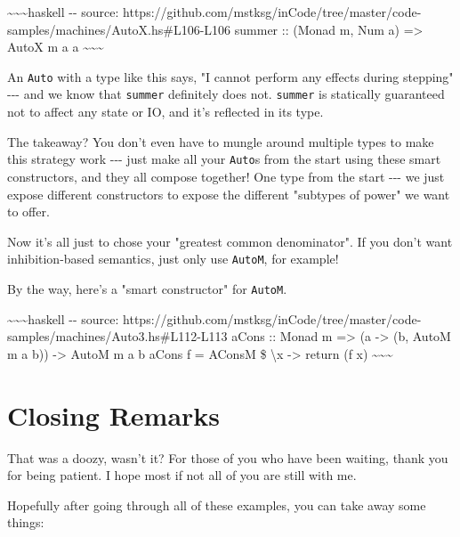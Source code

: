 \documentclass[]{article}
\begin{document}
\textasciitilde{}\textasciitilde{}\textasciitilde{}haskell -\/- source:
https://github.com/mstksg/inCode/tree/master/code-samples/machines/AutoX.hs\#L106-L106
summer :: (Monad m, Num a) =\textgreater{} AutoX m a a
\textasciitilde{}\textasciitilde{}\textasciitilde{}

An \texttt{Auto} with a type like this says, "I cannot perform any effects
during stepping" -\/-\/- and we know that \texttt{summer} definitely does not.
\texttt{summer} is statically guaranteed not to affect any state or IO, and it's
reflected in its type.

The takeaway? You don't even have to mungle around multiple types to make this
strategy work -\/-\/- just make all your \texttt{Auto}s from the start using
these smart constructors, and they all compose together! One type from the start
-\/-\/- we just expose different constructors to expose the different "subtypes
of power" we want to offer.

Now it's all just to chose your "greatest common denominator". If you don't want
inhibition-based semantics, just only use \texttt{AutoM}, for example!

By the way, here's a "smart constructor" for \texttt{AutoM}.

\textasciitilde{}\textasciitilde{}\textasciitilde{}haskell -\/- source:
https://github.com/mstksg/inCode/tree/master/code-samples/machines/Auto3.hs\#L112-L113
aCons :: Monad m =\textgreater{} (a -\textgreater{} (b, AutoM m a b))
-\textgreater{} AutoM m a b aCons f = AConsM \$ \textbackslash{}x
-\textgreater{} return (f x) \textasciitilde{}\textasciitilde{}\textasciitilde{}

\section{Closing Remarks}

That was a doozy, wasn't it? For those of you who have been waiting, thank you
for being patient. I hope most if not all of you are still with me.

Hopefully after going through all of these examples, you can take away some
things:
\end{document}
